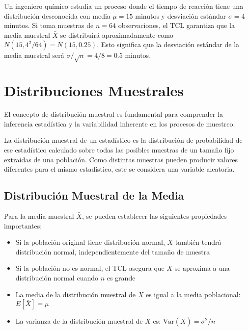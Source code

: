 \begin{example}
Un ingeniero químico estudia un proceso donde el tiempo de reacción tiene una distribución desconocida con media $\mu = 15$ minutos y desviación estándar $\sigma = 4$ minutos. Si toma muestras de $n = 64$ observaciones, el TCL garantiza que la media muestral $\bar{X}$ se distribuirá aproximadamente como $N(15, 4^2/64) = N(15, 0.25)$. Esto significa que la desviación estándar de la media muestral será $\sigma/\sqrt{n} = 4/8 = 0.5$ minutos.
\end{example}

\section{Distribuciones Muestrales}

El concepto de distribución muestral es fundamental para comprender la inferencia estadística y la variabilidad inherente en los procesos de muestreo.

\begin{definition}
La distribución muestral de un estadístico es la distribución de probabilidad de ese estadístico calculado sobre todas las posibles muestras de un tamaño fijo extraídas de una población. Como distintas muestras pueden producir valores diferentes para el mismo estadístico, este se considera una variable aleatoria.
\end{definition}

\subsection{Distribución Muestral de la Media}

\begin{remark}
Para la media muestral $\bar{X}$, se pueden establecer las siguientes propiedades importantes:
\begin{itemize}
    \item Si la población original tiene distribución normal, $\bar{X}$ también tendrá distribución normal, independientemente del tamaño de muestra
    \item Si la población no es normal, el TCL asegura que $\bar{X}$ se aproxima a una distribución normal cuando $n$ es grande
    \item La media de la distribución muestral de $\bar{X}$ es igual a la media poblacional: $E[\bar{X}] = \mu$
    \item La varianza de la distribución muestral de $\bar{X}$ es: $\text{Var}(\bar{X}) = \sigma^2/n$
\end{itemize}
\end{remark}

